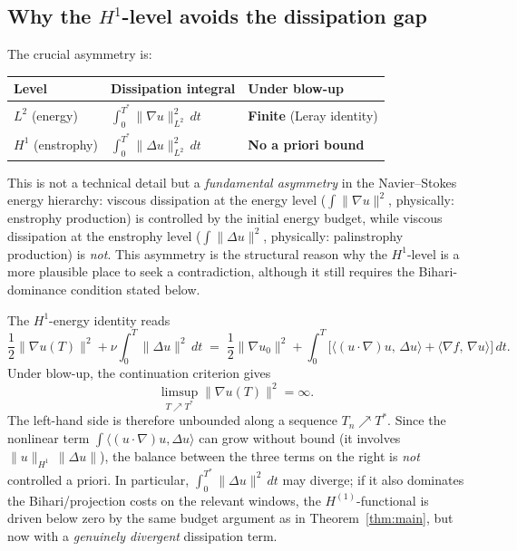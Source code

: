 \documentclass[12pt,a4paper]{article}
\theoremstyle{definition}
\theoremstyle{plain}
\theoremstyle{remark}
\begin{document}
\subsection{Why the \texorpdfstring{$H^1$}{H1}-level avoids the dissipation gap}

The crucial asymmetry is:

\begin{center}
\begin{tabular}{lll}
\hline
\textbf{Level} & \textbf{Dissipation integral} & \textbf{Under blow-up} \\
\hline
$L^2$\; (energy)
  & $\int_0^{T^*}\|\nabla u\|_{L^2}^2\,dt$
  & \textbf{Finite} (Leray identity) \\
$H^1$\; (enstrophy)
  & $\int_0^{T^*}\|\Delta u\|_{L^2}^2\,dt$
  & \textbf{No a priori bound} \\
\hline
\end{tabular}
\end{center}

\noindent
This is not a technical detail but a \emph{fundamental asymmetry}
in the Navier--Stokes energy hierarchy: viscous dissipation at the
energy level ($\int\|\nabla u\|^2$, physically: enstrophy production)
is controlled by the initial energy budget, while viscous dissipation
at the enstrophy level ($\int\|\Delta u\|^2$, physically: palinstrophy
production) is \emph{not}.  This asymmetry is the structural reason
why the $H^1$-level is a more plausible place to seek a contradiction,
although it still requires the Bihari-dominance condition stated below.

The $H^1$-energy identity reads
\begin{equation}\label{eq:H1-energy-id}
  \frac{1}{2}\|\nabla u(T)\|^2 + \nu\int_0^T\|\Delta u\|^2\,dt
  \;=\;
  \frac{1}{2}\|\nabla u_0\|^2
  + \int_0^T\!\bigl[\langle (u\cdot\nabla)u,\,\Delta u\rangle
  + \langle \nabla f,\, \nabla u\rangle\bigr]\,dt.
\end{equation}
Under blow-up, the continuation criterion gives
\[
  \limsup_{T\nearrow T^*}\|\nabla u(T)\|^2=\infty.
\]
The left-hand side is therefore unbounded along a sequence
$T_n\nearrow T^*$.  Since the nonlinear term
$\int\langle (u\cdot\nabla)u, \Delta u\rangle$ can grow without
bound (it involves $\|u\|_{H^1}\,\|\Delta u\|$), the balance
between the three terms on the right is \emph{not} controlled
a priori.  In particular, $\int_0^{T^*}\|\Delta u\|^2\,dt$ may
diverge; if it also dominates the Bihari/projection costs on the
relevant windows, the
$H^{(1)}$-functional is driven below zero by the same budget argument
as in Theorem~\ref{thm:main}, but now with a \emph{genuinely divergent}
dissipation term.
\end{document}
